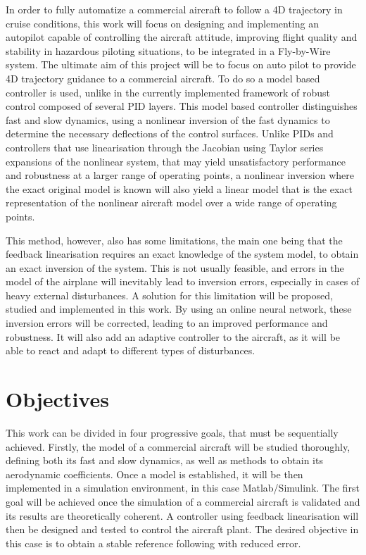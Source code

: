 In order to fully automatize a commercial aircraft to follow a 4D trajectory in cruise conditions, this work will focus on designing and implementing an autopilot capable of controlling the aircraft attitude, improving flight quality and stability in hazardous piloting situations, to be integrated in a Fly-by-Wire system. The ultimate aim of this project will be to focus on auto pilot to provide 4D trajectory guidance to a commercial aircraft. To do so a model based controller is used, unlike in the currently implemented framework of robust control composed of several PID layers. This model based controller distinguishes fast and slow dynamics, using a nonlinear inversion of the fast dynamics to determine the necessary deflections of the control surfaces. Unlike PIDs and controllers that use linearisation through the Jacobian using Taylor series expansions of the nonlinear system, that may yield unsatisfactory performance and robustness at a larger range of operating points, a nonlinear inversion where the exact original model is known will also yield a linear model that is the exact representation of the nonlinear aircraft model over a wide range of operating points. 

This method, however, also has some limitations, the main one being that the feedback linearisation requires an exact knowledge of the system model, to obtain an exact inversion of the system. This is not usually feasible, and errors in the model of the airplane will inevitably lead to inversion errors, especially in cases of heavy external disturbances. A solution for this limitation will be proposed, studied and implemented in this work. By using an online neural network, these inversion errors will be corrected, leading to an improved performance and robustness. It will also add an adaptive controller to the aircraft, as it will be able to react and adapt to different types of disturbances.

\section{Objectives}
\label{section:objectives}

This work can be divided in four progressive goals, that must be sequentially achieved. Firstly, the model of a commercial aircraft will be studied thoroughly, defining both its fast and slow dynamics, as well as methods to obtain its aerodynamic coefficients. Once a model is established, it will be then implemented in a simulation environment, in this case Matlab/Simulink. The first goal will be achieved once the simulation of a commercial aircraft is validated and its results are theoretically coherent. A controller using feedback linearisation will then be designed and tested to control the aircraft plant. The desired objective in this case is to obtain a stable reference following with reduced error.

